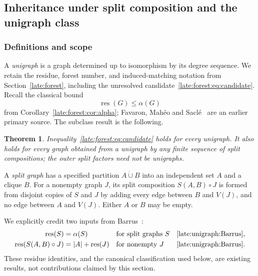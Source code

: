 \documentclass[11pt,a4paper]{article}
\newtheorem{theorem}{Theorem}[section]
\theoremstyle{definition}\newtheorem{definition}[theorem]{Definition}
\theoremstyle{remark}\newtheorem{remark}[theorem]{Remark}
\newcommand{\res}{\operatorname{res}}
\begin{document}
\subsection{Inheritance under split composition and the unigraph class}\label{late:unigraph}

\subsubsection{Definitions and scope}

A \emph{unigraph} is a graph determined up to isomorphism by its degree
sequence. We retain the residue, forest number, and induced-matching
notation from Section~\ref{late:forest}, including the unresolved
candidate~\eqref{late:forest:eq:candidate}. Recall the classical bound
\begin{equation}\label{late:unigraph:eq:classical}
 \res(G)\le\alpha(G)
\end{equation}
from Corollary~\ref{late:forest:cor:alpha}; Favaron, Mah\'eo and
Sacl\'e~\cite{late:FMS} are an earlier primary source.
The subclass result is the following.

\begin{theorem}\label{late:unigraph:thm:main}
Inequality~\eqref{late:forest:eq:candidate} holds for every unigraph. It also holds
for every graph obtained from a unigraph by any finite sequence of split
compositions; the outer split factors need not be unigraphs.
\end{theorem}

A \emph{split graph} has a specified partition $A\mathbin{\dot\cup} B$ into an
independent set $A$ and a clique $B$. For a nonempty graph $J$, its split
composition $S(A,B)\circ J$ is formed from disjoint copies of $S$ and $J$
by adding every edge between $B$ and $V(J)$, and no edge between $A$ and
$V(J)$. Either $A$ or $B$ may be empty.

We explicitly credit two inputs from Barrus~\cite{late:unigraph:Barrus}:
\begin{align}
\res(S)&=\alpha(S) &&\text{for split graphs $S$}
&&\text{\cite[Proposition 2.2]{late:unigraph:Barrus}},\label{late:unigraph:eq:split}\\
\res(S(A,B)\circ J)&=|A|+\res(J) &&\text{for nonempty $J$}
&&\text{\cite[Corollary 3.3]{late:unigraph:Barrus}}.\label{late:unigraph:eq:compose}
\end{align}
These residue identities, and the canonical classification used below,
are existing results, not contributions claimed by this section.
\end{document}
